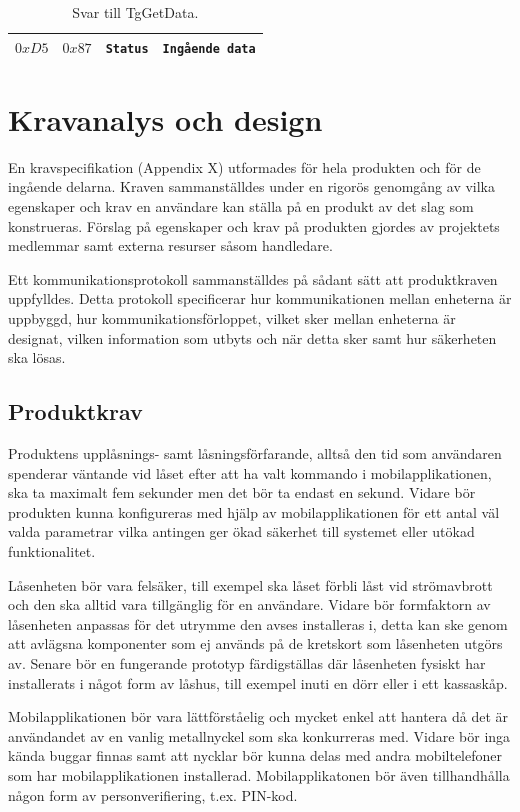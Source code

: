 \documentclass[11pt]{article}
\begin{document}
\begin{table}
\centering
\begin{tabular}{ |c|c|c|c| }
\hline
$0xD5$ & $0x87$ & \texttt{Status} & \texttt{Ingående data} \\
\hline
\end{tabular}
\caption{Svar till TgGetData.}
\label{tab:svar_TgGetData}
\end{table}

\section{Kravanalys och design}
En kravspecifikation (Appendix X) utformades för hela produkten och för de ingående delarna. Kraven sammanställdes under en rigorös genomgång av vilka egenskaper och krav en användare kan ställa på en produkt av det slag som konstrueras. Förslag på egenskaper och krav på produkten gjordes av projektets medlemmar samt externa resurser såsom handledare.

Ett kommunikationsprotokoll sammanställdes på sådant sätt att produktkraven uppfylldes. Detta protokoll  specificerar hur kommunikationen mellan enheterna är uppbyggd, hur kommunikationsförloppet, vilket sker mellan enheterna är designat, vilken information som utbyts och när detta sker samt hur säkerheten ska lösas.

\subsection{Produktkrav}
Produktens upplåsnings- samt låsningsförfarande, alltså den tid som användaren spenderar väntande vid låset efter att ha valt kommando i mobilapplikationen, ska ta maximalt fem sekunder men det bör ta endast en sekund. Vidare bör produkten kunna konfigureras med hjälp av mobilapplikationen för ett antal väl valda parametrar vilka antingen ger ökad säkerhet till systemet eller utökad funktionalitet.

Låsenheten bör vara felsäker, till exempel ska låset förbli låst vid strömavbrott och den ska alltid vara tillgänglig för en användare. Vidare bör formfaktorn av låsenheten anpassas för det utrymme den avses installeras i, detta kan ske genom att avlägsna komponenter som ej används på de kretskort som låsenheten utgörs av. Senare bör en fungerande prototyp färdigställas där låsenheten fysiskt har installerats i något form av låshus, till exempel inuti en dörr eller i ett kassaskåp.

Mobilapplikationen bör vara lättförståelig och mycket enkel att hantera då det är användandet av en vanlig metallnyckel som ska konkurreras med. Vidare bör inga kända buggar finnas samt att nycklar bör kunna delas med andra mobiltelefoner som har mobilapplikationen installerad. Mobilapplikatonen bör även tillhandhålla någon form av personverifiering, t.ex. PIN-kod.
\end{document}
